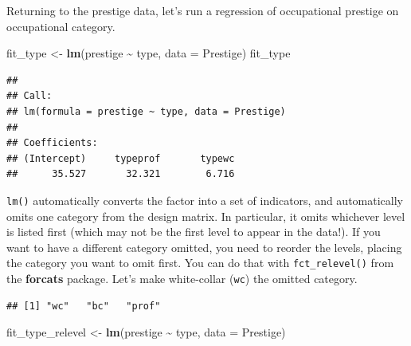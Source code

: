 \documentclass[
  12pt,
  oneside,openany]{book}
\newenvironment{Shaded}{\begin{snugshade}}{\end{snugshade}}
\newcommand{\DataTypeTok}[1]{\textcolor[rgb]{0.13,0.29,0.53}{#1}}
\newcommand{\KeywordTok}[1]{\textcolor[rgb]{0.13,0.29,0.53}{\textbf{#1}}}
\newcommand{\NormalTok}[1]{#1}
\newcommand{\OperatorTok}[1]{\textcolor[rgb]{0.81,0.36,0.00}{\textbf{#1}}}
\newcommand{\StringTok}[1]{\textcolor[rgb]{0.31,0.60,0.02}{#1}}
\begin{document}
Returning to the prestige data, let's run a regression of occupational prestige on occupational category.

\begin{Shaded}
\begin{Highlighting}[]
\NormalTok{fit\_type \textless{}{-}}\StringTok{ }\KeywordTok{lm}\NormalTok{(prestige }\OperatorTok{\textasciitilde{}}\StringTok{ }\NormalTok{type, }\DataTypeTok{data =}\NormalTok{ Prestige)}
\NormalTok{fit\_type}
\end{Highlighting}
\end{Shaded}

\begin{verbatim}
## 
## Call:
## lm(formula = prestige ~ type, data = Prestige)
## 
## Coefficients:
## (Intercept)     typeprof       typewc  
##      35.527       32.321        6.716
\end{verbatim}

\texttt{lm()} automatically converts the factor into a set of indicators, and automatically omits one category from the design matrix. In particular, it omits whichever level is listed first (which may not be the first level to appear in the data!). If you want to have a different category omitted, you need to reorder the levels, placing the category you want to omit first. You can do that with \texttt{fct\_relevel()} from the \textbf{forcats} package. Let's make white-collar (\texttt{wc}) the omitted category.

\begin{Shaded}
\end{Shaded}

\begin{verbatim}
## [1] "wc"   "bc"   "prof"
\end{verbatim}

\begin{Shaded}
\begin{Highlighting}[]
\NormalTok{fit\_type\_relevel \textless{}{-}}\StringTok{ }\KeywordTok{lm}\NormalTok{(prestige }\OperatorTok{\textasciitilde{}}\StringTok{ }\NormalTok{type, }\DataTypeTok{data =}\NormalTok{ Prestige)}
\end{Highlighting}
\end{Shaded}
\end{document}
